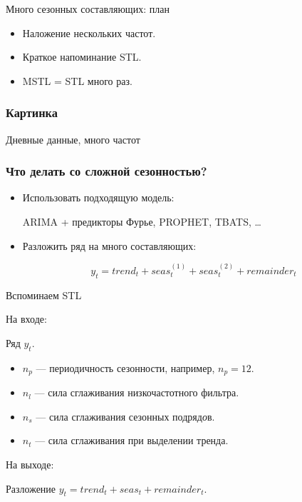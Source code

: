 
\begin{frame} %


\end{frame}



\begin{frame}{Много сезонных составляющих: план}
  \begin{itemize}[<+->]
    \item Наложение \alert{нескольких частот}.
    \item Краткое напоминание STL.
    \item MSTL = STL \alert{много раз}.
  \end{itemize}

\end{frame}

\begin{frame}
  \frametitle{Картинка}

  Дневные данные, много частот
  
\end{frame}

\begin{frame}
  \frametitle{Что делать со сложной сезонностью?}

  \begin{itemize}[<+->]
    \item Использовать \alert{подходящую} модель:
    
    ARIMA + предикторы Фурье, PROPHET, TBATS, \ldots

    \item Разложить ряд на \alert{много} составляющих:
    
    \[
      y_t = trend_t + seas_t^{(1)} + seas_t^{(2)} + remainder_t
    \]
  \end{itemize}
  

\end{frame}


\begin{frame}{Вспоминаем STL}

  \alert{На входе:}
  
  Ряд $y_t$.
  \pause
  \begin{itemize}
    \item $n_p$ — периодичность сезонности, например, $n_p=12$. \pause 
    \item $n_l$ — сила сглаживания низкочастотного фильтра.   \pause
    \item $n_s$ — сила сглаживания сезонных подряд\textit{о}в. \pause
    \item $n_t$ — сила сглаживания при выделении тренда.     
  \end{itemize}

  \pause
  \alert{На выходе:}
  
  Разложение $y_t = trend_t + seas_t + remainder_t$.  
\end{frame}
  
